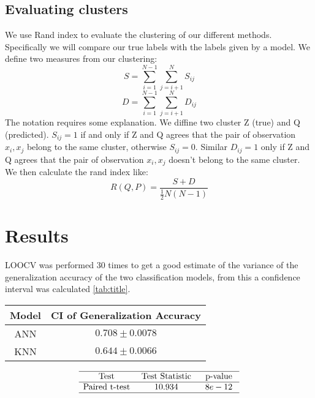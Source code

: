 \documentclass{article}
\begin{document}
\subsection*{Evaluating clusters}
We use Rand index to evaluate the clustering of our different methods. Specifically we will compare our true labels with the labels given by a model.
We define two measures from our clustering:
\begin{equation}
S=\sum_{i=1}^{N-1} \sum_{j=i+1}^{N} S_{i j}
\end{equation}
\begin{equation}
D=\sum_{i=1}^{N-1} \sum_{j=i+1}^{N} D_{i j}
\end{equation}
The notation requires some explanation. We diffine two cluster Z (true) and Q (predicted). $S_{ij} = 1$ if and only if  Z and Q agrees that the pair of observation ${x_i,x_j}$ belong to the same cluster, otherwise $S_{ij} = 0$. Similar  $D_{ij} = 1$ only if Z and Q agrees that the pair of observation ${x_i,x_j}$ doesn't belong to the same cluster. 
We then calculate the rand index like:
\begin{equation}
R(Q, P)=\frac{S+D}{\frac{1}{2} N(N-1)}
\end{equation}

\section{Results}
LOOCV was performed 30 times to get a good estimate of the variance of the generalization accuracy of the two classification models, from this a confidence interval was calculated \ref{tab:title}.

\begin{minipage}{\linewidth}
\centering
{} 
\begin{tabular}{ c c}\toprule[1.5pt]
\bf Model  & \bf CI of Generalization Accuracy \\\midrule
ANN  & $0.708 \pm 0.0078$  \\\midrule
KNN  & $0.644 \pm 0.0066$ \\
\bottomrule[1.25pt]
\end {tabular}\par
\label{tab:title}
\end{minipage} \bigskip


\begin{equation}
\begin{array}{ccc}
\hline \text { Test } & {\text { Test Statistic }} & {\text { p-value }} \\
\hline \text {Paired t-test} & {10.934} & {8e-12} \\
\hline
\end{array}
\end{equation}
\end{document}
